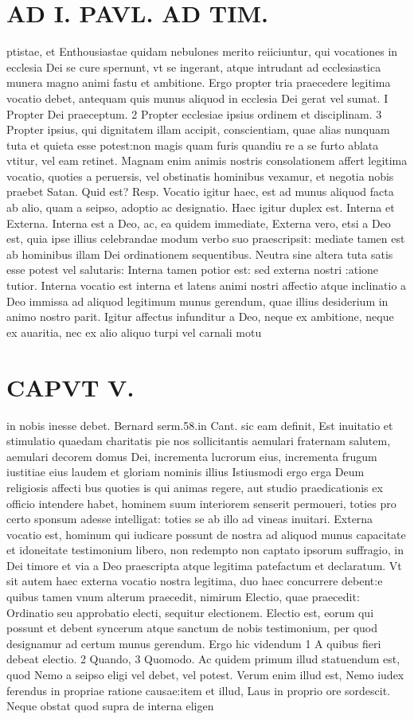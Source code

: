 \documentclass{article}
\begin{document}
\begin{pages}
\section*{AD I. PAVL. AD TIM. }
\marginpar{[ p.3*f. ]}\pstart ptistae, et Enthousiastae quidam nebulones merito reiiciuntur, qui vocationes in ecclesia Dei se cure spernunt, vt se ingerant, atque intrudant ad ecclesiastica munera magno animi fastu et ambitione. Ergo propter tria praecedere legitima vocatio debet, antequam quis munus aliquod in ecclesia Dei gerat vel sumat. I Propter Dei praeceptum. 2 Propter ecclesiae ipsius ordinem et disciplinam. 3 Propter ipsius, qui dignitatem illam accipit, conscientiam, quae alias nunquam tuta et quieta esse potest:non magis quam furis quandiu re a se furto ablata vtitur, vel eam retinet. Magnam enim animis nostris consolationem affert legitima vocatio, quoties a peruersis, vel obstinatis hominibus vexamur, et negotia nobis praebet Satan. Quid est? Resp. Vocatio igitur haec, est ad munus aliquod facta ab alio, quam a seipso, adoptio ac designatio. Haec igitur duplex est. Interna et Externa. Interna est a Deo, ac, ea quidem immediate, Externa vero, etsi a Deo est, quia ipse illius celebrandae modum verbo suo praescripsit: mediate tamen est ab hominibus illam Dei ordinationem sequentibus. Neutra sine altera tuta satis esse potest vel salutaris: Interna tamen potior est: sed externa nostri :atione tutior. Interna vocatio est interna et latens animi nostri affectio atque inclinatio a Deo immissa ad aliquod legitimum munus gerendum, quae illius desiderium in animo nostro parit. Igitur affectus infunditur a Deo, neque ex ambitione, neque ex auaritia, nec ex alio aliquo turpi vel carnali motu  \pend
\section*{CAPVT V. }
\marginpar{[ p.345 ]}\pstart in nobis inesse debet. Bernard serm.58.in Cant. sic eam definit, Est inuitatio et stimulatio quaedam charitatis pie nos sollicitantis aemulari fraternam salutem, aemulari decorem domus Dei, incrementa lucrorum eius, incrementa frugum iustitiae eius laudem et gloriam nominis illius Istiusmodi ergo erga Deum religiosis affecti bus quoties is qui animas regere, aut studio praedicationis ex officio intendere habet, hominem suum interiorem senserit permoueri, toties pro certo sponsum adesse intelligat: toties se ab illo ad vineas inuitari. Externa vocatio est, hominum qui iudicare possunt de nostra ad aliquod munus capacitate et idoneitate testimonium libero, non redempto non captato ipsorum suffragio, in Dei timore et via a Deo praescripta atque legitima patefactum et declaratum. Vt sit autem haec externa vocatio nostra legitima, duo haec concurrere debent:e quibus tamen vnum alterum praecedit, nimirum Electio, quae praecedit: Ordinatio seu approbatio electi, sequitur electionem. Electio est, eorum qui possunt et debent syncerum atque sanctum de nobis testimonium, per quod designamur ad certum munus gerendum. Ergo hic videndum 1 A quibus fieri debeat electio. 2 Quando, 3 Quomodo. Ac quidem primum illud statuendum est, quod Nemo a seipso eligi vel debet, vel potest. Verum enim illud est, Nemo iudex ferendus in propriae ratione causae:item et illud, Laus in proprio ore sordescit. Neque obstat quod supra de interna eligen\pend

\end{pages}
\end{document}
